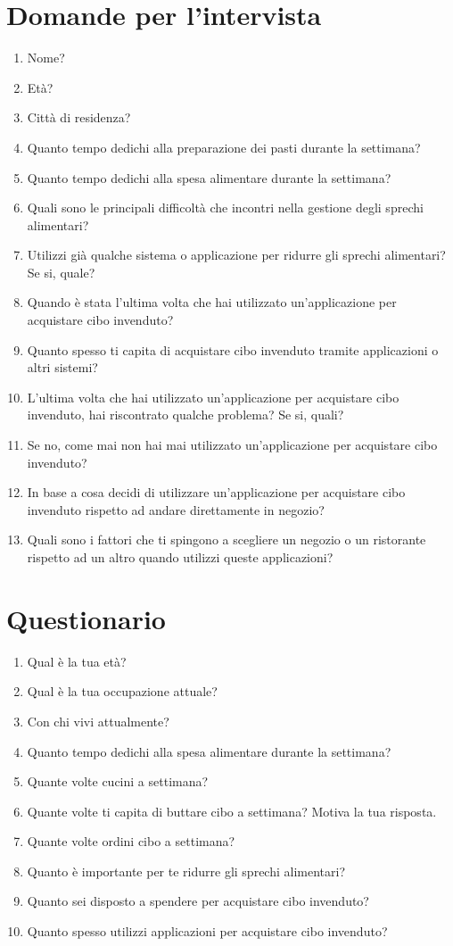 \documentclass{article}
\begin{document}
\section*{Domande per l'intervista}
\begin{enumerate}
    \item Nome?
    \item Età?
    \item Città di residenza?
    \item Quanto tempo dedichi alla preparazione dei pasti durante la settimana?
    \item Quanto tempo dedichi alla spesa alimentare durante la settimana?
    \item Quali sono le principali difficoltà che incontri nella gestione degli sprechi alimentari?
    \item Utilizzi già qualche sistema o applicazione per ridurre gli sprechi alimentari? Se si, quale?
    \item Quando è stata l'ultima volta che hai utilizzato un'applicazione per acquistare cibo invenduto?
    \item Quanto spesso ti capita di acquistare cibo invenduto tramite applicazioni o altri sistemi?
    \item L'ultima volta che hai utilizzato un'applicazione per acquistare cibo invenduto, hai riscontrato qualche problema? Se si, quali?
    \item Se no, come mai non hai mai utilizzato un'applicazione per acquistare cibo invenduto?
    \item In base a cosa decidi di utilizzare un'applicazione per acquistare cibo invenduto rispetto ad andare direttamente in negozio?
    \item Quali sono i fattori che ti spingono a scegliere un negozio o un ristorante rispetto ad un altro quando utilizzi queste applicazioni?
\end{enumerate}

\section*{Questionario}
\begin{enumerate}
    \item Qual è la tua età?
    \item Qual è la tua occupazione attuale?
    \item Con chi vivi attualmente?
    \item Quanto tempo dedichi alla spesa alimentare durante la settimana?
    \item Quante volte cucini a settimana?
    \item Quante volte ti capita di buttare cibo a settimana? Motiva la tua risposta.
    \item Quante volte ordini cibo a settimana?
    \item Quanto è importante per te ridurre gli sprechi alimentari?
    \item Quanto sei disposto a spendere per acquistare cibo invenduto?
    \item Quanto spesso utilizzi applicazioni per acquistare cibo invenduto?
\end{enumerate}
\end{document}
